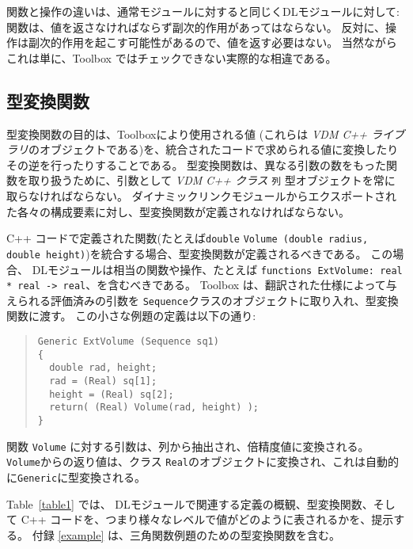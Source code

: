 \documentclass[\pformat,12pt]{jarticle}
\begin{document}
関数と操作の違いは、通常モジュールに対すると同じくDLモジュールに対して:関数は、値を返さなければならず副次的作用があってはならない。
反対に、操作は副次的作用を起こす可能性があるので、値を返す必要はない。
当然ながらこれは単に、Toolbox ではチェックできない実際的な相違である。


\subsection{型変換関数}

型変換関数の目的は、Toolboxにより使用される値 (これらは {\it VDM C++ ライブラリ}のオブジェクトである)を、統合されたコードで求められる値に変換したりその逆を行ったりすることである。
型変換関数は、異なる引数の数をもった関数を取り扱うために、引数として {\it
  VDM C++ クラス}  {\tt 列} 型オブジェクトを常に取らなければならない。
ダイナミックリンクモジュールからエクスポートされた各々の構成要素に対し、型変換関数が定義されなければならない。

 C++ コードで定義された関数(たとえば{\tt double} {\tt Volume (double radius, double height)})を統合する場合、型変換関数が定義されるべきである。
この場合、 DLモジュールは相当の関数や操作、たとえば {\tt functions ExtVolume: real * real -> real}、を含むべきである。
Toolbox は、翻訳された仕様によって与えられる評価済みの引数を {\tt Sequence}クラスのオブジェクトに取り入れ、型変換関数に渡す。
この小さな例題の定義は以下の通り:

\begin{quote}
\begin{verbatim}
Generic ExtVolume (Sequence sq1)
{
  double rad, height;
  rad = (Real) sq[1];
  height = (Real) sq[2];
  return( (Real) Volume(rad, height) );
}
\end{verbatim}
\end{quote}

関数 {\tt Volume} に対する引数は、列から抽出され、倍精度値に変換される。
{\tt Volume}からの返り値は、クラス {\tt Real}のオブジェクトに変換され、これは自動的に{\tt Generic}に型変換される。

Table~\ref{table1} では、 DLモジュールで関連する定義の概観、型変換関数、そして C++ コードを、つまり様々なレベルで値がどのように表されるかを、提示する。 
付録 \ref{example} は、三角関数例題のための型変換関数を含む。
\end{document}
